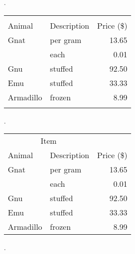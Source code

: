 \documentclass{article}
\begin{document}
{
.\newline\newline\newline
}






\begin{tabular}{llr}
\firsthline
\multicolumn{2}{c}{Item} \\
\cline{1-2}
Animal    & Description & Price (\$) \\
\hline
Gnat      & per gram    & 13.65      \\
          & each        & 0.01       \\
Gnu       & stuffed     & 92.50      \\
Emu       & stuffed     & 33.33      \\
Armadillo & frozen      & 8.99       \\
\lasthline
\end{tabular}





{
.\newline\newline\newline
}






\begin{tabular}{llr}  
\toprule
\multicolumn{2}{c}{Item} \\
\cmidrule(r){1-2}
Animal    & Description & Price (\$) \\
\midrule
Gnat      & per gram    & 13.65      \\
          &    each     & 0.01       \\
Gnu       & stuffed     & 92.50      \\
Emu       & stuffed     & 33.33      \\
Armadillo & frozen      & 8.99       \\
\bottomrule
\end{tabular}





{
.\newline\newline\newline
}
\end{document}
